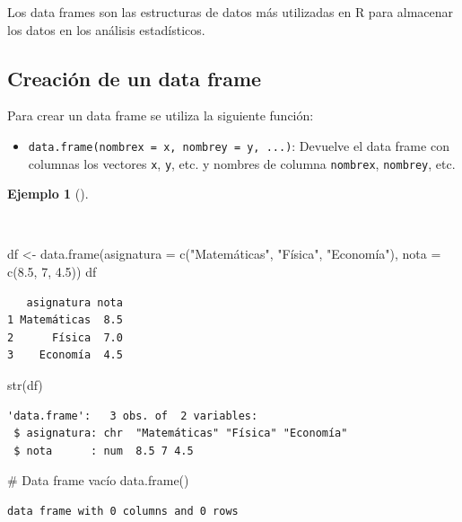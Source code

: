\documentclass[
  spanish,
  a4paper,
]{scrreport}
\newenvironment{Shaded}{\begin{snugshade}}{\end{snugshade}}
\newcommand{\AttributeTok}[1]{\textcolor[rgb]{0.40,0.45,0.13}{#1}}
\newcommand{\CommentTok}[1]{\textcolor[rgb]{0.37,0.37,0.37}{#1}}
\newcommand{\DecValTok}[1]{\textcolor[rgb]{0.68,0.00,0.00}{#1}}
\newcommand{\FloatTok}[1]{\textcolor[rgb]{0.68,0.00,0.00}{#1}}
\newcommand{\FunctionTok}[1]{\textcolor[rgb]{0.28,0.35,0.67}{#1}}
\newcommand{\NormalTok}[1]{\textcolor[rgb]{0.00,0.23,0.31}{#1}}
\newcommand{\OtherTok}[1]{\textcolor[rgb]{0.00,0.23,0.31}{#1}}
\newcommand{\StringTok}[1]{\textcolor[rgb]{0.13,0.47,0.30}{#1}}
\providecommand{\tightlist}{%
  \setlength{\itemsep}{0pt}\setlength{\parskip}{0pt}}
\theoremstyle{definition}
\theoremstyle{definition}
\newtheorem{example}{Ejemplo}[chapter]
\theoremstyle{remark}
\begin{document}
Los data frames son las estructuras de datos más utilizadas en R para
almacenar los datos en los análisis estadísticos.

\subsection{Creación de un data
frame}\label{creaciuxf3n-de-un-data-frame}

Para crear un data frame se utiliza la siguiente función:

\begin{itemize}
\tightlist
\item
  \texttt{data.frame(nombrex\ =\ x,\ nombrey\ =\ y,\ ...)}: Devuelve el
  data frame con columnas los vectores \texttt{x}, \texttt{y}, etc. y
  nombres de columna \texttt{nombrex}, \texttt{nombrey}, etc.
\end{itemize}

\begin{example}[]\protect\hypertarget{exm-creacion-data-frames}{}\label{exm-creacion-data-frames}

~

\begin{Shaded}
\begin{Highlighting}[]
\NormalTok{df }\OtherTok{\textless{}{-}} \FunctionTok{data.frame}\NormalTok{(}\AttributeTok{asignatura =} \FunctionTok{c}\NormalTok{(}\StringTok{"Matemáticas"}\NormalTok{, }\StringTok{"Física"}\NormalTok{, }\StringTok{"Economía"}\NormalTok{), }\AttributeTok{nota =} \FunctionTok{c}\NormalTok{(}\FloatTok{8.5}\NormalTok{, }\DecValTok{7}\NormalTok{, }\FloatTok{4.5}\NormalTok{))}
\NormalTok{df}
\end{Highlighting}
\end{Shaded}

\begin{verbatim}
   asignatura nota
1 Matemáticas  8.5
2      Física  7.0
3    Economía  4.5
\end{verbatim}

\begin{Shaded}
\begin{Highlighting}[]
\FunctionTok{str}\NormalTok{(df)}
\end{Highlighting}
\end{Shaded}

\begin{verbatim}
'data.frame':   3 obs. of  2 variables:
 $ asignatura: chr  "Matemáticas" "Física" "Economía"
 $ nota      : num  8.5 7 4.5
\end{verbatim}

\begin{Shaded}
\begin{Highlighting}[]
\CommentTok{\# Data frame vacío}
\FunctionTok{data.frame}\NormalTok{()}
\end{Highlighting}
\end{Shaded}

\begin{verbatim}
data frame with 0 columns and 0 rows
\end{verbatim}

\end{example}
\end{document}
